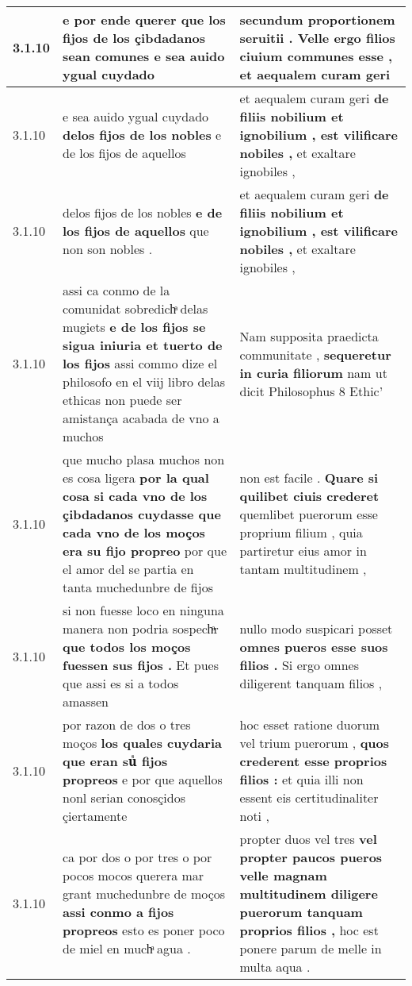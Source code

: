 \begin{tabular}{|p{1cm}|p{6.5cm}|p{6.5cm}|}
3.1.10 & e por ende querer \textbf{ que los fijos de los çibdadanos sean comunes } e sea auido ygual cuydado & secundum proportionem seruitii . \textbf{ Velle ergo filios ciuium communes esse , } et aequalem curam geri \\\hline
3.1.10 & e sea auido ygual cuydado \textbf{ delos fijos de los nobles } e de los fijos de aquellos & et aequalem curam geri \textbf{ de filiis nobilium et ignobilium , est vilificare nobiles , } et exaltare ignobiles , \\\hline
3.1.10 & delos fijos de los nobles \textbf{ e de los fijos de aquellos } que non son nobles . & et aequalem curam geri \textbf{ de filiis nobilium et ignobilium , est vilificare nobiles , } et exaltare ignobiles , \\\hline
3.1.10 & assi ca conmo de la comunidat sobredichͣ delas mugiets \textbf{ e de los fijos se sigua iniuria et tuerto de los fijos } assi commo dize el philosofo en el viij libro delas ethicas non puede ser amistança acabada de vno a muchos & Nam supposita praedicta communitate , \textbf{ sequeretur in curia filiorum } nam ut dicit Philosophus 8 Ethic’ \\\hline
3.1.10 & que mucho plasa muchos non es cosa ligera \textbf{ por la qual cosa si cada vno de los çibdadanos cuydasse que cada vno de los moços era su fijo propreo } por que el amor del se partia en tanta muchedunbre de fijos & non est facile . \textbf{ Quare si quilibet ciuis crederet } quemlibet puerorum esse proprium filium , quia partiretur eius amor in tantam multitudinem , \\\hline
3.1.10 & si non fuesse loco en ninguna manera non podria sospechͣr \textbf{ que todos los moços fuessen sus fijos . } Et pues que assi es si a todos amassen & nullo modo suspicari posset \textbf{ omnes pueros esse suos filios . } Si ergo omnes diligerent tanquam filios , \\\hline
3.1.10 & por razon de dos o tres moços \textbf{ los quales cuydaria que eran suᷤ fijos propreos } e por que aquellos nonl serian conosçidos çiertamente & hoc esset ratione duorum vel trium puerorum , \textbf{ quos crederent esse proprios filios : } et quia illi non essent eis certitudinaliter noti , \\\hline
3.1.10 & ca por dos o por tres o por pocos mocos querera mar grant muchedunbre de moços \textbf{ assi conmo a fijos propreos } esto es poner poco de miel en muchͣ agua . & propter duos vel tres \textbf{ vel propter paucos pueros velle magnam multitudinem diligere puerorum tanquam proprios filios , } hoc est ponere parum de melle in multa aqua . \\\hline

\end{tabular}
